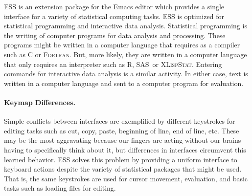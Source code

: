 \documentclass{article}
\newcommand*{\SAS}{\textsc{SAS}}
\newcommand*{\XLispStat}{\textsc{XLispStat}}
\newcommand*{\Fortran}{\textsc{Fortran}}
\begin{document}
ESS is an extension package for the Emacs editor which provides a
single interface for a variety of statistical computing tasks.  ESS is
optimized for statistical programming and interactive data analysis.
Statistical programming is the writing of computer programs for data
analysis and processing.  These programs might be written in a
computer language that requires as a compiler such as C or \Fortran.
But, more likely, they are written in a computer language that only
requires an interpreter such as R, \SAS\ or \XLispStat.
Entering commands for interactive data analysis is a similar activity.
In either case, text is written in a computer language and sent to a
computer program for evaluation.

\paragraph{Keymap Differences.} %
\label{sec:confl-keym}

Simple conflicts between interfaces are exemplified by different
keystrokes for editing tasks such as cut, copy, paste, beginning of
line, end of line, etc.  These may be the most aggravating because our
fingers are acting without our brains having to specifically think
about it, but differences in interfaces circumvent this learned
behavior.  ESS solves this problem by providing a uniform interface to
keyboard actions despite the variety of statistical packages that
might be used.  That is, the same keystrokes are used for cursor
movement, evaluation, and basic tasks such as loading files for
editing.
\end{document}
